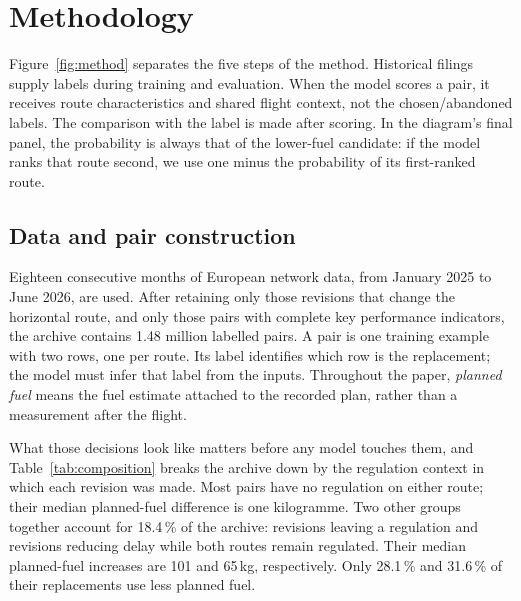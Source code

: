 \documentclass[conference,10pt,a4paper,IEEEoverridecommandlockouts]{IEEEtran}
\begin{document}
\section{Methodology} \label{sec:method}

Figure~\ref{fig:method} separates the five steps of the method. Historical
filings supply labels during training and evaluation. When the model
scores a pair, it receives route characteristics and shared flight
context, not the chosen/abandoned labels. The comparison with the label
is made after scoring. In the diagram's final panel, the probability is
always that of the lower-fuel candidate: if the model ranks that route
second, we use one minus the probability of its first-ranked route.

\subsection{Data and pair construction}

Eighteen consecutive months of European network data, from January 2025 to
June 2026, are used. After retaining only those revisions that change the
horizontal route, and only those pairs with complete key performance
indicators, the archive contains 1.48 million labelled pairs. A pair is one training
example with two rows, one per route. Its label identifies which row is
the replacement; the model must infer that label from the inputs.
Throughout the paper, \emph{planned fuel} means the fuel estimate
attached to the recorded plan, rather than a measurement after the flight.



What those decisions look like matters before any model touches them, and
Table~\ref{tab:composition} breaks the archive down by the regulation
context in which each revision was made.
Most pairs have no regulation on either route; their median planned-fuel
difference is one kilogramme. Two other groups together account for
18.4\,\% of the archive: revisions leaving a regulation and revisions
reducing delay while both routes remain regulated. Their median
planned-fuel increases are 101 and 65\,kg, respectively. Only
28.1\,\% and 31.6\,\% of their replacements use less planned fuel.
\end{document}
